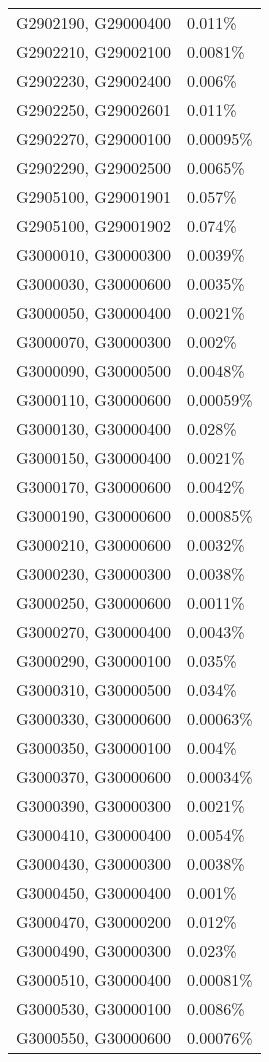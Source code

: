 \begin{longtable}[]{@{}ll@{}}
G2902190, G29000400 & 0.011\% \\
G2902210, G29002100 & 0.0081\% \\
G2902230, G29002400 & 0.006\% \\
G2902250, G29002601 & 0.011\% \\
G2902270, G29000100 & 0.00095\% \\
G2902290, G29002500 & 0.0065\% \\
G2905100, G29001901 & 0.057\% \\
G2905100, G29001902 & 0.074\% \\
G3000010, G30000300 & 0.0039\% \\
G3000030, G30000600 & 0.0035\% \\
G3000050, G30000400 & 0.0021\% \\
G3000070, G30000300 & 0.002\% \\
G3000090, G30000500 & 0.0048\% \\
G3000110, G30000600 & 0.00059\% \\
G3000130, G30000400 & 0.028\% \\
G3000150, G30000400 & 0.0021\% \\
G3000170, G30000600 & 0.0042\% \\
G3000190, G30000600 & 0.00085\% \\
G3000210, G30000600 & 0.0032\% \\
G3000230, G30000300 & 0.0038\% \\
G3000250, G30000600 & 0.0011\% \\
G3000270, G30000400 & 0.0043\% \\
G3000290, G30000100 & 0.035\% \\
G3000310, G30000500 & 0.034\% \\
G3000330, G30000600 & 0.00063\% \\
G3000350, G30000100 & 0.004\% \\
G3000370, G30000600 & 0.00034\% \\
G3000390, G30000300 & 0.0021\% \\
G3000410, G30000400 & 0.0054\% \\
G3000430, G30000300 & 0.0038\% \\
G3000450, G30000400 & 0.001\% \\
G3000470, G30000200 & 0.012\% \\
G3000490, G30000300 & 0.023\% \\
G3000510, G30000400 & 0.00081\% \\
G3000530, G30000100 & 0.0086\% \\
G3000550, G30000600 & 0.00076\% \\

\end{longtable}
